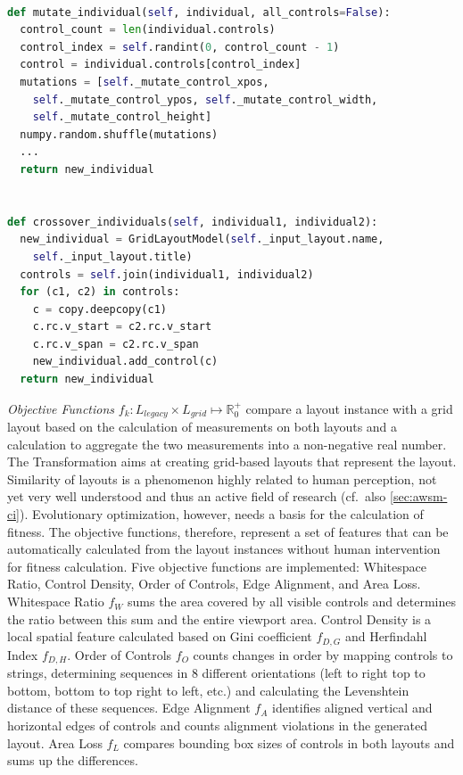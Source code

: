 \begin{lstlisting}[language=Python, captionpos=t, caption=Mutation and Crossover, label=lst:ui-mutation]

def mutate_individual(self, individual, all_controls=False):
  control_count = len(individual.controls)
  control_index = self.randint(0, control_count - 1)
  control = individual.controls[control_index]
  mutations = [self._mutate_control_xpos,
    self._mutate_control_ypos, self._mutate_control_width,
    self._mutate_control_height] 
  numpy.random.shuffle(mutations)
  ...
  return new_individual
  
  
def crossover_individuals(self, individual1, individual2):
  new_individual = GridLayoutModel(self._input_layout.name,
    self._input_layout.title)   
  controls = self.join(individual1, individual2)
  for (c1, c2) in controls:
    c = copy.deepcopy(c1)
    c.rc.v_start = c2.rc.v_start
    c.rc.v_span = c2.rc.v_span
    new_individual.add_control(c)
  return new_individual
\end{lstlisting}

\pagebreak
\emph{Objective Functions} \(f_k : L_{legacy} \times L_{grid} \mapsto \mathbb{R}_0^+\) compare a  layout instance with a grid layout based on the calculation of measurements on both layouts and a calculation to aggregate the two measurements into a non-negative real number.
The \gls{Transformation} aims at creating grid-based layouts that represent the  layout.
Similarity of layouts is a phenomenon highly related to human perception, not yet very well understood and thus an active field of research (cf.~also \cref{sec:awsm-ci}).
Evolutionary optimization, however, needs a basis for the calculation of fitness.
The objective functions, therefore, represent a set of features that can be automatically calculated from the layout instances without human intervention for fitness calculation.
Five objective functions are implemented: Whitespace Ratio, Control Density, Order of Controls, Edge Alignment, and Area Loss.
Whitespace Ratio \(f_W\) sums the area covered by all visible controls and determines the ratio between this sum and the entire viewport area.
Control Density is a local spatial feature calculated based on Gini coefficient \(f_{D,G}\) and Herfindahl Index \(f_{D,H}\).
Order of Controls \(f_O\) counts changes in order by mapping controls to strings, determining sequences in 8 different orientations (left to right top to bottom, bottom to top right to left, etc.) and calculating the Levenshtein distance of these sequences.
Edge Alignment \(f_A\) identifies aligned vertical and horizontal edges of controls and counts alignment violations in the generated layout.
Area Loss \(f_L\) compares bounding box sizes of controls in both layouts and sums up the differences.

